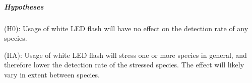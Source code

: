 \subparagraph{Hypotheses} 

(H0): Usage of white LED flash will have no effect on the detection rate of any species.

(HA): Usage of white LED flash will stress one or more species in general, and therefore lower the detection rate of the stressed species. The effect will likely vary in extent between species. %





